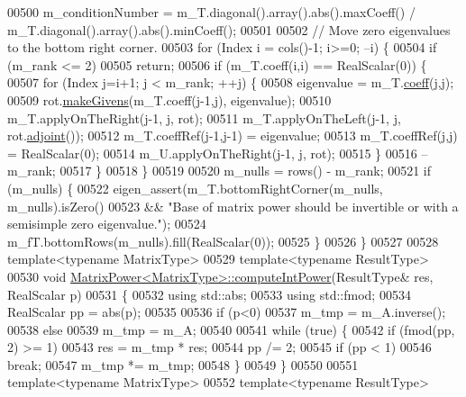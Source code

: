 \begin{DoxyCode}
00500   m\_conditionNumber = m\_T.diagonal().array().abs().maxCoeff() / m\_T.diagonal().array().abs().minCoeff();
00501 
00502   \textcolor{comment}{// Move zero eigenvalues to the bottom right corner.}
00503   \textcolor{keywordflow}{for} (Index i = cols()-1; i>=0; --i) \{
00504     \textcolor{keywordflow}{if} (m\_rank <= 2)
00505       \textcolor{keywordflow}{return};
00506     \textcolor{keywordflow}{if} (m\_T.coeff(i,i) == RealScalar(0)) \{
00507       \textcolor{keywordflow}{for} (Index j=i+1; j < m\_rank; ++j) \{
00508         eigenvalue = m\_T.\hyperlink{class_eigen_1_1_plain_object_base_afbfc12954f16d21aedb7bd839f64a278}{coeff}(j,j);
00509         rot.\hyperlink{group___jacobi___module_af73c81e9cc139b7e0d877ce553b02ec0}{makeGivens}(m\_T.coeff(j-1,j), eigenvalue);
00510         m\_T.applyOnTheRight(j-1, j, rot);
00511         m\_T.applyOnTheLeft(j-1, j, rot.\hyperlink{group___jacobi___module_a89c8ea615f8fa77ddd5810a1e5fde4da}{adjoint}());
00512         m\_T.coeffRef(j-1,j-1) = eigenvalue;
00513         m\_T.coeffRef(j,j) = RealScalar(0);
00514         m\_U.applyOnTheRight(j-1, j, rot);
00515       \}
00516       --m\_rank;
00517     \}
00518   \}
00519 
00520   m\_nulls = rows() - m\_rank;
00521   \textcolor{keywordflow}{if} (m\_nulls) \{
00522     eigen\_assert(m\_T.bottomRightCorner(m\_nulls, m\_nulls).isZero()
00523         && \textcolor{stringliteral}{"Base of matrix power should be invertible or with a semisimple zero eigenvalue."});
00524     m\_fT.bottomRows(m\_nulls).fill(RealScalar(0));
00525   \}
00526 \}
00527 
00528 \textcolor{keyword}{template}<\textcolor{keyword}{typename} MatrixType>
00529 \textcolor{keyword}{template}<\textcolor{keyword}{typename} ResultType>
00530 \textcolor{keywordtype}{void} \hyperlink{class_eigen_1_1_matrix_power}{MatrixPower<MatrixType>::computeIntPower}(ResultType& res, 
      RealScalar p)
00531 \{
00532   \textcolor{keyword}{using} std::abs;
00533   \textcolor{keyword}{using} std::fmod;
00534   RealScalar pp = abs(p);
00535 
00536   \textcolor{keywordflow}{if} (p<0) 
00537     m\_tmp = m\_A.inverse();
00538   \textcolor{keywordflow}{else}     
00539     m\_tmp = m\_A;
00540 
00541   \textcolor{keywordflow}{while} (\textcolor{keyword}{true}) \{
00542     \textcolor{keywordflow}{if} (fmod(pp, 2) >= 1)
00543       res = m\_tmp * res;
00544     pp /= 2;
00545     \textcolor{keywordflow}{if} (pp < 1)
00546       \textcolor{keywordflow}{break};
00547     m\_tmp *= m\_tmp;
00548   \}
00549 \}
00550 
00551 \textcolor{keyword}{template}<\textcolor{keyword}{typename} MatrixType>
00552 \textcolor{keyword}{template}<\textcolor{keyword}{typename} ResultType>

\end{DoxyCode}
